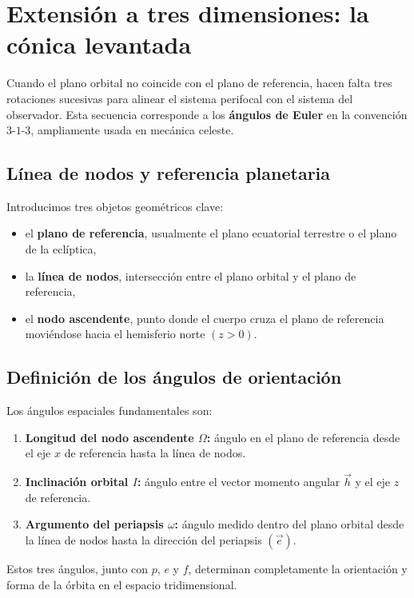 \section{Extensión a tres dimensiones: la cónica levantada}
Cuando el plano orbital no coincide con el plano de referencia, hacen falta tres rotaciones sucesivas para alinear el sistema perifocal con el sistema del observador. Esta secuencia corresponde a los \textbf{ángulos de Euler} en la convención \(3\)-\(1\)-\(3\), ampliamente usada en mecánica celeste.

\subsection{Línea de nodos y referencia planetaria}
Introducimos tres objetos geométricos clave:
\begin{itemize}
    \item el \textbf{plano de referencia}, usualmente el plano ecuatorial terrestre o el plano de la eclíptica,
    \item la \textbf{línea de nodos}, intersección entre el plano orbital y el plano de referencia,
    \item el \textbf{nodo ascendente}, punto donde el cuerpo cruza el plano de referencia moviéndose hacia el hemisferio norte \((z>0)\).
\end{itemize}

\subsection{Definición de los ángulos de orientación}
Los ángulos espaciales fundamentales son:
\begin{enumerate}
    \item \textbf{Longitud del nodo ascendente \(\Omega\):} ángulo en el plano de referencia desde el eje \(x\) de referencia hasta la línea de nodos.
    \item \textbf{Inclinación orbital \(I\):} ángulo entre el vector momento angular \(\vec{h}\) y el eje \(z\) de referencia.
    \item \textbf{Argumento del periapsis \(\omega\):} ángulo medido dentro del plano orbital desde la línea de nodos hasta la dirección del periapsis \((\vec{e})\).
\end{enumerate}

Estos tres ángulos, junto con \(p\), \(e\) y \(f\), determinan completamente la orientación y forma de la órbita en el espacio tridimensional.


